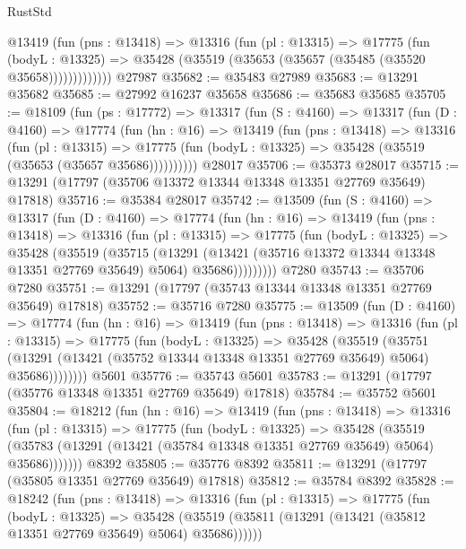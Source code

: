 \begin{lexlean}{RustStd}
\begin{coremodule}
            @13419
              (fun (pns : @13418) =>
              @13316
                (fun (pl : @13315) =>
                @17775
                  (fun (bodyL : @13325) =>
                  @35428 (@35519 (@35653 (@35657 (@35485 (@35520 @35658)))))))))))))
    @27987
@35682 := @35483 @27989
@35683 := @13291 @35682
@35685 := @27992 @16237 @35658
@35686 := @35683 @35685
@35705 := @18109
    (fun (ps : @17772) =>
    @13317
      (fun (S : @4160) =>
      @13317
        (fun (D : @4160) =>
        @17774
          (fun (hn : @16) =>
          @13419
            (fun (pns : @13418) =>
            @13316
              (fun (pl : @13315) =>
              @17775 (fun (bodyL : @13325) => @35428 (@35519 (@35653 (@35657 @35686))))))))))
    @28017
@35706 := @35373 @28017
@35715 := @13291 (@17797 (@35706 @13372 @13344 @13348 @13351 @27769 @35649) @17818)
@35716 := @35384 @28017
@35742 := @13509
    (fun (S : @4160) =>
    @13317
      (fun (D : @4160) =>
      @17774
        (fun (hn : @16) =>
        @13419
          (fun (pns : @13418) =>
          @13316
            (fun (pl : @13315) =>
            @17775
              (fun (bodyL : @13325) =>
              @35428
                (@35519
                  (@35715
                    (@13291
                      (@13421 (@35716 @13372 @13344 @13348 @13351 @27769 @35649) @5064)
                      @35686)))))))))
    @7280
@35743 := @35706 @7280
@35751 := @13291 (@17797 (@35743 @13344 @13348 @13351 @27769 @35649) @17818)
@35752 := @35716 @7280
@35775 := @13509
    (fun (D : @4160) =>
    @17774
      (fun (hn : @16) =>
      @13419
        (fun (pns : @13418) =>
        @13316
          (fun (pl : @13315) =>
          @17775
            (fun (bodyL : @13325) =>
            @35428
              (@35519
                (@35751
                  (@13291 (@13421 (@35752 @13344 @13348 @13351 @27769 @35649) @5064) @35686))))))))
    @5601
@35776 := @35743 @5601
@35783 := @13291 (@17797 (@35776 @13348 @13351 @27769 @35649) @17818)
@35784 := @35752 @5601
@35804 := @18212
    (fun (hn : @16) =>
    @13419
      (fun (pns : @13418) =>
      @13316
        (fun (pl : @13315) =>
        @17775
          (fun (bodyL : @13325) =>
          @35428
            (@35519
              (@35783 (@13291 (@13421 (@35784 @13348 @13351 @27769 @35649) @5064) @35686)))))))
    @8392
@35805 := @35776 @8392
@35811 := @13291 (@17797 (@35805 @13351 @27769 @35649) @17818)
@35812 := @35784 @8392
@35828 := @18242
    (fun (pns : @13418) =>
    @13316
      (fun (pl : @13315) =>
      @17775
        (fun (bodyL : @13325) =>
        @35428 (@35519 (@35811 (@13291 (@13421 (@35812 @13351 @27769 @35649) @5064) @35686))))))

\end{coremodule}
\end{lexlean}
